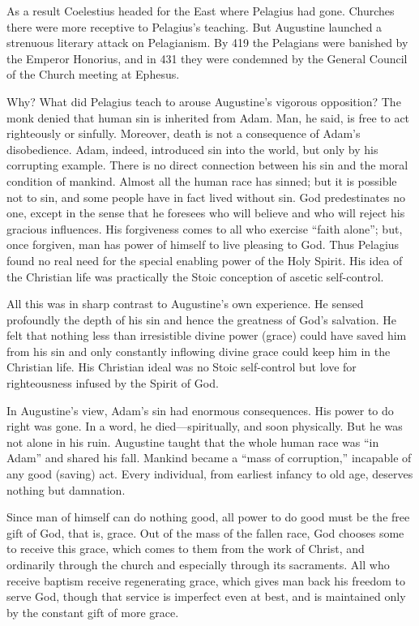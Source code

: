 As a result Coelestius headed for the East where Pelagius had gone. Churches there were more
receptive to Pelagius’s teaching. But Augustine launched a strenuous literary attack on Pelagianism.
By 419 the Pelagians were banished by the Emperor Honorius, and in 431 they were condemned by the
General Council of the Church meeting at Ephesus.

Why? What did Pelagius teach to arouse Augustine’s vigorous opposition? The monk denied that human
sin is inherited from Adam. Man, he said, is free to act righteously or sinfully. Moreover, death is
not a consequence of Adam’s disobedience. Adam, indeed, introduced sin into the world, but only by
his corrupting example. There is no direct connection between his sin and the moral condition of
mankind. Almost all the human race has sinned; but it is possible not to sin, and some people have
in fact lived without sin. God predestinates no one, except in the sense that he foresees who will
believe and who will reject his gracious influences. His forgiveness comes to all who exercise
“faith alone”; but, once forgiven, man has power of himself to live pleasing to God. Thus Pelagius
found no real need for the special enabling power of the Holy Spirit. His idea of the Christian life
was practically the Stoic conception of ascetic self-control.

All this was in sharp contrast to Augustine’s own experience. He sensed profoundly the depth of his
sin and hence the greatness of God’s salvation. He felt that nothing less than irresistible divine
power (grace) could have saved him from his sin and only constantly inflowing divine grace could
keep him in the Christian life. His Christian ideal was no Stoic self-control but love for
righteousness infused by the Spirit of God.

In Augustine’s view, Adam’s sin had enormous consequences. His power to do right was gone. In a
word, he died—spiritually, and soon physically. But he was not alone in his ruin. Augustine taught
that the whole human race was “in Adam” and shared his fall. Mankind became a “mass of corruption,”
incapable of any good (saving) act. Every individual, from earliest infancy to old age, deserves
nothing but damnation.

Since man of himself can do nothing good, all power to do good must be the free gift of God, that
is, grace. Out of the mass of the fallen race, God chooses some to receive this grace, which comes
to them from the work of Christ, and ordinarily through the church and especially through its
sacraments. All who receive baptism receive regenerating grace, which gives man back his freedom to
serve God, though that service is imperfect even at best, and is maintained only by the constant
gift of more grace.

